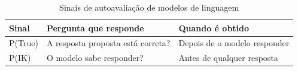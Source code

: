 \begin{table}[htb]
  \caption{Sinais de autoavaliação de modelos de linguagem}
  \label{tab:sinais-incerteza}
  \centering
  \begin{tabular}{lll}
    \toprule
    \textbf{Sinal} & \textbf{Pergunta que responde} & \textbf{Quando é obtido} \\
    \midrule
    P(True) & A resposta proposta está correta? & Depois de o modelo responder \\
    P(IK)   & O modelo sabe responder?          & Antes de qualquer resposta \\
    \bottomrule
  \end{tabular}
\end{table}
